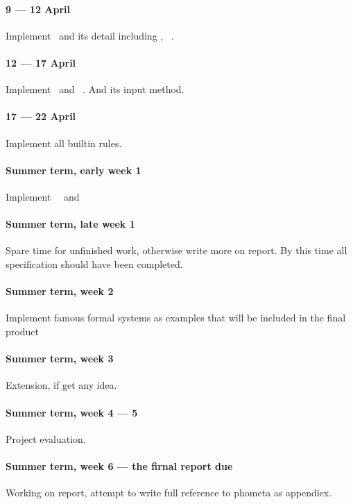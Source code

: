 \paragraph{9 --- 12 April} Implement \kDefinition\ and its detail including \kMatch, \kLet\ \kBe.

\paragraph{12 --- 17 April} Implement \kSequence\ and \kLiteral\ \kGrammar. And its input method.

\paragraph{17 --- 22 April} Implement all builtin rules.

\paragraph{Summer term, early week 1} Implement \kCompound\ \kRule\ and \kAlias\

\paragraph{Summer term, late week 1} Spare time for unfinished work, otherwise write more on report. By this time all specification should have been completed.

\paragraph{Summer term, week 2} Implement famous formal systems as examples that will be included in the final product

\paragraph{Summer term, week 3} Extension, if get any idea.

\paragraph{Summer term, week 4 --- 5} Project evaluation.

\paragraph{Summer term, week 6 --- the firnal report due} Working on report, attempt to write full reference to phometa as appendiex.


